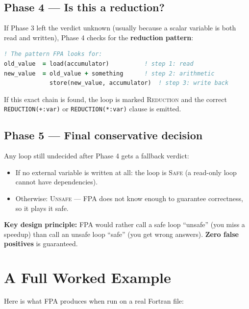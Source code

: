 \documentclass[12pt,a4paper]{article}
\begin{document}
\subsection{Phase 4 --- Is this a reduction?}

If Phase 3 left the verdict unknown (usually because a scalar variable
is both read and written), Phase 4 checks for the \textbf{reduction
pattern}:

\begin{lstlisting}[language=Fortran]
! The pattern FPA looks for:
old_value  = load(accumulator)          ! step 1: read
new_value  = old_value + something      ! step 2: arithmetic
             store(new_value, accumulator)  ! step 3: write back
\end{lstlisting}

If this exact chain is found, the loop is marked \textsc{Reduction}
and the correct \texttt{REDUCTION(+:var)} or \texttt{REDUCTION(*:var)}
clause is emitted.

\subsection{Phase 5 --- Final conservative decision}

Any loop still undecided after Phase 4 gets a fallback verdict:

\begin{itemize}[leftmargin=1.5em]
  \item If no external variable is written at all: the loop is
        \textsc{Safe} (a read-only loop cannot have dependencies).
  \item Otherwise: \textsc{Unsafe} --- FPA does not know enough to
        guarantee correctness, so it plays it safe.
\end{itemize}

\begin{infobox}
\textbf{Key design principle:} FPA would rather call a safe loop
``unsafe'' (you miss a speedup) than call an unsafe loop ``safe''
(you get wrong answers). \textbf{Zero false positives} is guaranteed.
\end{infobox}

\section{A Full Worked Example}

Here is what FPA produces when run on a real Fortran file:
\end{document}
